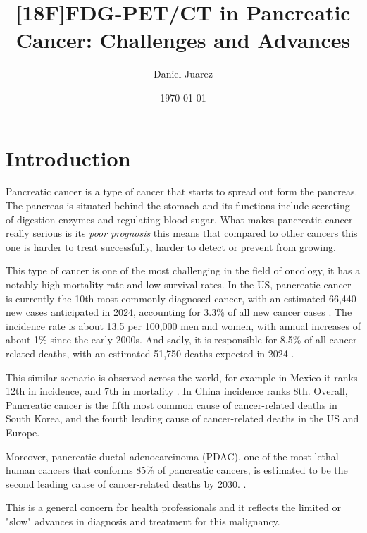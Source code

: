 \documentclass[11pt]{article} %
\title{[18F]FDG-PET/CT in Pancreatic Cancer: Challenges and Advances}
\author{Daniel Juarez}
\date{\today}
\begin{document}
\maketitle

\section{Introduction}

Pancreatic cancer is a type of cancer that starts to spread out form the pancreas. The pancreas is situated behind the stomach and its functions include secreting of digestion enzymes and regulating blood sugar. What makes pancreatic cancer really serious is its \textit{poor prognosis} this means that compared to other cancers this one is harder to treat successfully, harder to detect or prevent from growing.

This type of cancer is one of the most challenging in the field of oncology, it has a notably high mortality rate and low survival rates. In the US, pancreatic cancer is currently the 10th most commonly diagnosed cancer, with an estimated 66,440 new cases anticipated in 2024, accounting for 3.3\% of all new cancer cases \cite{SEER2024}. The incidence rate is about 13.5 per 100,000 men and women, with annual increases of about 1\% since the early 2000s. And sadly, it is responsible for 8.5\% of all cancer-related deaths, with an estimated 51,750 deaths expected in 2024 \cite{SEER2024}.

This similar scenario is observed across the world, for example in Mexico it ranks 12th in incidence, and 7th in mortality \cite{GlobocanMexico}. In China incidence ranks 8th. Overall, Pancreatic cancer is the fifth most common cause of cancer-related deaths in South Korea, and the fourth leading cause of cancer-related deaths in the US and Europe. \cite{NCCNGuidelines}
 
 Moreover, pancreatic ductal adenocarcinoma (PDAC), one of the most lethal human cancers that conforms 85\% of pancreatic cancers, is estimated to be the second leading cause of cancer-related deaths by 2030. \cite{Li2022}\cite{Cancers2023}.

 This is a general concern for health professionals and it reflects the limited or "slow" advances in diagnosis and treatment for this malignancy.

\end{document}
